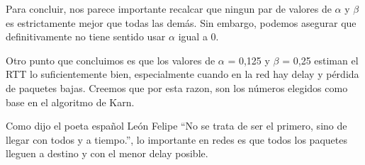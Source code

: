 Para concluir, nos parece importante recalcar que ningun par de valores de $\alpha$ y $\beta$ es estrictamente mejor que todas las demás. Sin embargo, podemos asegurar que definitivamente no tiene sentido usar $\alpha$ igual a 0.

Otro punto que concluimos es que los valores de $\alpha$ = 0,125 y $\beta$ = 0,25 estiman el RTT lo suficientemente bien, especialmente cuando en la red hay delay y pérdida de paquetes bajas. Creemos que por esta razon, son los números elegidos como base en el algoritmo de Karn.


Como dijo el poeta español León Felipe ``No se trata de ser el primero, sino de llegar con todos y a tiempo.'', lo importante en redes es que todos los paquetes lleguen a destino y con el menor delay posible.